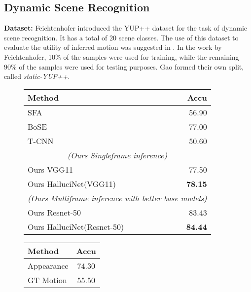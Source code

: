 \documentclass[10pt,twocolumn,letterpaper]{article}
\begin{document}
\subsection{Dynamic Scene Recognition}
\label{exp_dsr}
\noindent\textbf{Dataset:} Feichtenhofer \etal introduced the \textsc{YUP++} dataset \cite{yuppp} for the task of dynamic scene recognition. It has a total of 20 scene classes. The use of this dataset to evaluate the utility of inferred motion was suggested in \cite{im2flow}.  In the work by Feichtenhofer, 10\% of the samples were used for training, while the remaining 90\% of the samples were used for testing purposes. Gao \etal \cite{im2flow} formed their own split, called \textit{static-YUP++}. \\
{

\begin{table}
\centering
\small
\begin{subfigure}[t]{\columnwidth}
\centering
\small
\begin{tabular}{lr}
\toprule
\textbf{Method}         & \textbf{Accu} \\
\midrule
SFA \cite{sfa}                    & 56.90             \\
BoSE \cite{bose}                   & 77.00             \\
T-CNN \cite{tcnn}                  & 50.60             \\
\midrule
\multicolumn{2}{c}{\textit{(Ours Singleframe inference)}} \\
Ours VGG11         & 77.50             \\
Ours HalluciNet(VGG11) & \textbf{78.15}             \\
\midrule
\multicolumn{2}{c}{\textit{(Ours Multiframe inference with better base models)}} \\
Ours Resnet-50         & 83.43             \\
Ours HalluciNet(Resnet-50) & \textbf{84.44}             \\
\bottomrule
\end{tabular}
\caption{}
\label{tab:res_dyna_scene_rec_yup}
\end{subfigure}
\begin{subfigure}[t]{\columnwidth}
\centering
\small
\begin{tabular}{lc}
\toprule
\textbf{Method}              & \textbf{Accu} \\
\midrule
Appearance \cite{im2flow}                  & 74.30             \\
GT Motion \cite{im2flow}                    & 55.50             \\

\end{tabular}
\end{subfigure}
\end{table}}
\end{document}
